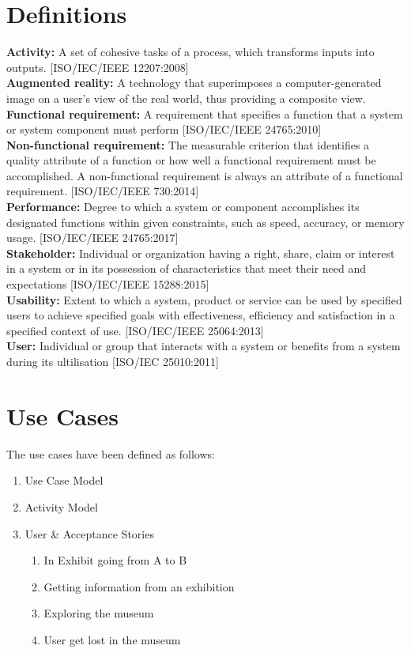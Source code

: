 \section{Definitions}
\textbf{Activity:} A set of cohesive tasks of a process, which transforms inputs into outputs. [ISO/IEC/IEEE 12207:2008]\\
\newline
\textbf{Augmented reality:} A technology that superimposes a computer-generated image on a user's view of the real world, thus providing a composite view. \\
\newline
\textbf{Functional requirement:} A requirement that specifies a function that a system or system component must perform [ISO/IEC/IEEE 24765:2010]\\
\newline
\textbf{Non-functional requirement:} The measurable criterion that identifies a quality attribute of a function or how well a functional requirement must be accomplished. A non-functional requirement is always an attribute of a functional requirement. [ISO/IEC/IEEE 730:2014]\\
\newline
\textbf{Performance:} Degree to which a system or component accomplishes its designated functions within given constraints, such as speed, accuracy, or memory usage. [ISO/IEC/IEEE 24765:2017]\\
\newline
\textbf{Stakeholder:} Individual or organization having a right, share, claim or interest in a system or in its possession of characteristics that meet their need and expectations [ISO/IEC/IEEE 15288:2015]\\
\newline
\textbf{Usability:} Extent to which a system, product or service can be used by specified users to achieve specified goals with effectiveness, efficiency and satisfaction in a specified context of use. [ISO/IEC/IEEE 25064:2013]\\
\newline
\textbf{User:} Individual or group that interacts with a system or benefits from a system during its ultilisation [ISO/IEC 25010:2011]

\section{Use Cases}
The use cases have been defined as follows:
\begin{enumerate}
    \item Use Case Model
    \item Activity Model
    \item User \& Acceptance Stories
    \begin{enumerate}
        \item In Exhibit going from A to B
        \item Getting information from an exhibition
        \item Exploring the museum
        \item User get lost in the museum
    \end{enumerate}
\end{enumerate}

